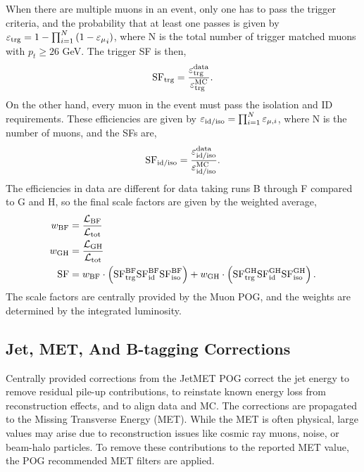 When there are multiple muons in an event, only one has to pass the trigger criteria, and the probability that at least one passes is given by $\varepsilon_\textup{trg}=1 - \prod_{i=1}^{N}{{(1-\varepsilon_{\mu}}_{i})}$, where N is the total number of trigger matched muons with $p_t \geq 26$ GeV. The trigger SF is then,  
\begin{equation}
    \label{eqn:sf_trg}
    \textup{SF}_\textup{trg} = \frac{\varepsilon_\textup{trg}^\textup{data}}{\varepsilon_\textup{trg}^\textup{MC}}.
\end{equation}
On the other hand, every muon in the event must pass the isolation and ID requirements. These efficiencies are given by $\varepsilon_\textup{id/iso} = \prod_{i=1}^{N} \varepsilon_{\mu,i}$, where N is the number of muons, and the SFs are,
\begin{equation}
    \label{eqn:sf_id_iso}
    \textup{SF}_\textup{id/iso} = \frac{\varepsilon_\textup{id/iso}^\textup{data}}{\varepsilon_\textup{id/iso}^\textup{MC}}.
\end{equation}
The efficiencies in data are different for data taking runs B through F compared to G and H, so the final scale factors are given by the weighted average,
\begin{align}
    w_\textup{BF} &= \frac{\mathcal{L}_\textup{BF}}{\mathcal{L}_\textup{tot}} \\
    w_\textup{GH} &= \frac{\mathcal{L}_\textup{GH}}{\mathcal{L}_\textup{tot}} \\
    \label{eqn:sf}
    \textup{SF} &= w_\textup{BF} \cdot \left( \textup{SF}_\textup{trg}^\textup{BF} \textup{SF}_\textup{id}^\textup{BF} \textup{SF}_\textup{iso}^\textup{BF}\right) 
    + w_\textup{GH}\cdot \left( \textup{SF}_\textup{trg}^\textup{GH} \textup{SF}_\textup{id}^\textup{GH} \textup{SF}_\textup{iso}^\textup{GH}\right).
\end{align}
The scale factors are centrally provided by the Muon POG, and the weights are determined by the integrated luminosity.
\subsection{Jet, MET, And B-tagging Corrections}
Centrally provided corrections from the JetMET POG correct the jet energy to remove residual pile-up contributions, to reinstate known energy loss from reconstruction effects, and to align data and MC. The corrections are propagated to the Missing Transverse Energy (MET). While the MET is often physical, large values may arise due to reconstruction issues like cosmic ray muons, noise, or beam-halo particles. To remove these contributions to the reported MET value, the POG recommended MET filters are applied. 

